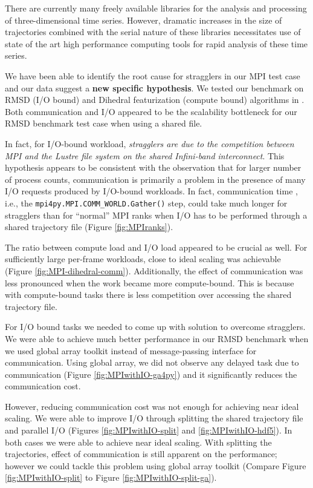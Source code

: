 \label{concl}
There are currently many freely available libraries for the analysis and processing of three-dimensional time series.
However, dramatic increases in the size of trajectories combined with the serial nature of these libraries necessitates 
use of state of the art high performance computing tools for rapid analysis of these time series. 

We have been able to identify the root cause for stragglers in our MPI test case and our data suggest a \textbf{new specific hypothesis}. 
We tested our benchmark on RMSD (I/O bound) and Dihedral featurization (compute bound) algorithms in .
Both communication and I/O appeared to be the scalability bottleneck for our RMSD benchmark test case when using a shared file.

In fact, for I/O-bound workload, \emph{stragglers are due to the competition between MPI and the Lustre file system on the shared Infini-band interconnect}. 
This hypothesis appears to be consistent with the observation that for larger number of process counts, communication is primarily a problem in
the presence of many I/O requests produced by I/O-bound workloads.
In fact, communication time \tcomm, i.e., the \texttt{mpi4py.MPI.COMM\_WORLD.Gather()} step, could take
much longer for stragglers than for ``normal'' MPI ranks when I/O has to be performed through a shared trajectory file (Figure \ref{fig:MPIranks}). 

The ratio between compute load and I/O load appeared to be crucial as well. 
For sufficiently large per-frame workloads, close to ideal scaling was achievable (Figure \ref{fig:MPI-dihedral-comm}). 
Additionally, the effect of communication was less pronounced when the work became more compute-bound.
This is because with compute-bound tasks there is less competition over accessing the shared trajectory file.

For I/O bound tasks we needed to come up with solution to overcome stragglers. 
We were able to achieve much better performance in our RMSD benchmark when we used global array toolkit instead of message-passing interface for communication. 
Using global array, we did not observe any delayed task due to communication (Figure \ref{fig:MPIwithIO-ga4py}) and it significantly reduces the communication cost. 

However, reducing communication cost was not enough for achieving near ideal scaling.
We were able to improve I/O through splitting the shared trajectory file and parallel I/O (Figures \ref{fig:MPIwithIO-split} and \ref{fig:MPIwithIO-hdf5}). 
In both cases we were able to achieve near ideal scaling.
With splitting the trajectories, effect of communication is still apparent on the performance; however we could tackle this problem using 
global array toolkit (Compare Figure \ref{fig:MPIwithIO-split} to Figure \ref{fig:MPIwithIO-split-ga}).

